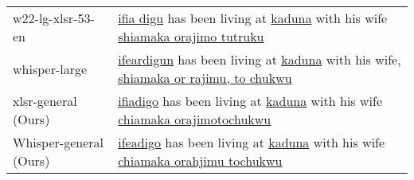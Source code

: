 \documentclass{INTERSPEECH2023}
\begin{document}
\begin{table*}[t]
\begin{tabularx}{\textwidth}{l|X}
w22-lg-xlsr-53-en & \underline{ifia digu} has been living at \underline{kaduna} with his wife \underline{shiamaka orajimo tutruku} \\





whisper-large & \underline{ifeardigun} has been living at \underline{kaduna} with his wife, \underline{shiamaka or rajimu, to chukwu} \\

xlsr-general (Ours) & \underline{ifiadigo} has been living at \underline{kaduna} with his wife \underline{chiamaka orajimotochukwu} \\
Whisper-general (Ours) & \underline{ifeadigo} has been living at \underline{kaduna} with his wife \underline{chiamaka orahjimu tochukwu} \\
\bottomrule
\end{tabularx}
\label{tab:failure_examples}
\end{table*}
\end{document}
